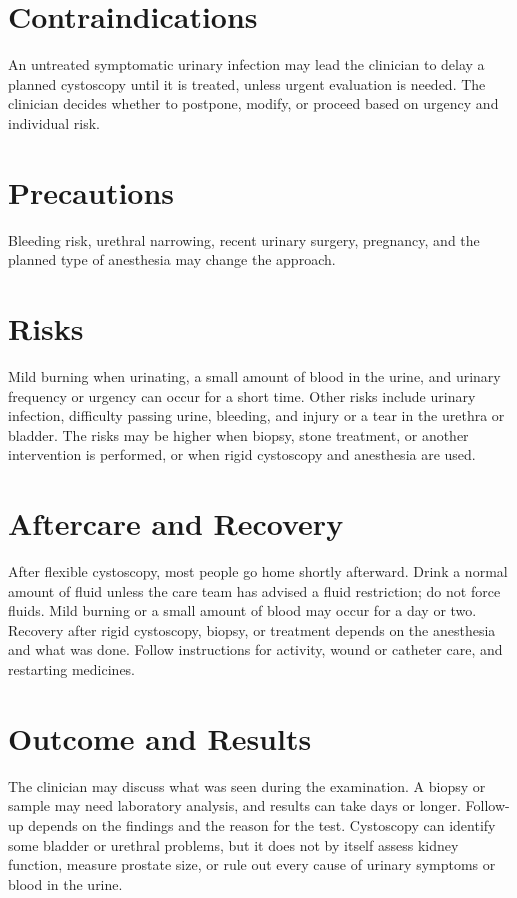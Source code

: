 \section*{Contraindications}
An untreated symptomatic urinary infection may lead the clinician to delay a planned cystoscopy until it is treated, unless urgent evaluation is needed. The clinician decides whether to postpone, modify, or proceed based on urgency and individual risk.

\section*{Precautions}
Bleeding risk, urethral narrowing, recent urinary surgery, pregnancy, and the planned type of anesthesia may change the approach.

\section*{Risks}
Mild burning when urinating, a small amount of blood in the urine, and urinary frequency or urgency can occur for a short time. Other risks include urinary infection, difficulty passing urine, bleeding, and injury or a tear in the urethra or bladder. The risks may be higher when biopsy, stone treatment, or another intervention is performed, or when rigid cystoscopy and anesthesia are used.

\section*{Aftercare and Recovery}
After flexible cystoscopy, most people go home shortly afterward. Drink a normal amount of fluid unless the care team has advised a fluid restriction; do not force fluids. Mild burning or a small amount of blood may occur for a day or two. Recovery after rigid cystoscopy, biopsy, or treatment depends on the anesthesia and what was done. Follow instructions for activity, wound or catheter care, and restarting medicines.

\section*{Outcome and Results}
The clinician may discuss what was seen during the examination. A biopsy or sample may need laboratory analysis, and results can take days or longer. Follow-up depends on the findings and the reason for the test. Cystoscopy can identify some bladder or urethral problems, but it does not by itself assess kidney function, measure prostate size, or rule out every cause of urinary symptoms or blood in the urine.

